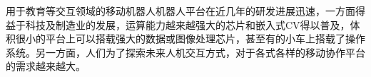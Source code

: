 用于教育等交互领域的移动机器人机器人平台在近几年的研发进展迅速，一方面得益于科技及制造业的发展，运算能力越来越强大的芯片和嵌入式CV得以普及，体积很小的平台上可以搭载强大的数据或图像处理芯片，甚至有的小车上搭载了操作系统。另一方面，人们为了探索未来人机交互方式，对于各式各样的移动协作平台的需求越来越大。


